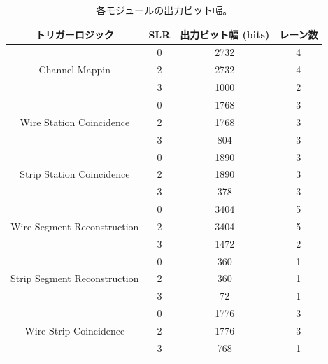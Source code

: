 \begin{table}[]
    \centering
    \caption[各モジュールの出力ビット幅]{各モジュールの出力ビット幅。}
    \label{tab:output_width}    
    \begin{tabular}{|c|c|c|c|}
    \hline
    トリガーロジック                                      & SLR & 出力ビット幅 (bits) & レーン数 \\ \hline\hline
    \multirow{3}{*}{Channel Mappin}               & 0   & 2732          & 4    \\ \cline{2-4} 
                                                  & 2   & 2732          & 4    \\ \cline{2-4} 
                                                  & 3   & 1000          & 2    \\ \hline
    \multirow{3}{*}{Wire Station Coincidence}     & 0   & 1768          & 3    \\ \cline{2-4} 
                                                  & 2   & 1768          & 3    \\ \cline{2-4} 
                                                  & 3   & 804           & 3    \\ \hline
    \multirow{3}{*}{Strip Station Coincidence}    & 0   & 1890          & 3    \\ \cline{2-4} 
                                                  & 2   & 1890          & 3    \\ \cline{2-4} 
                                                  & 3   & 378           & 3    \\ \hline
    \multirow{3}{*}{Wire Segment Reconstruction}  & 0   & 3404          & 5    \\ \cline{2-4} 
                                                  & 2   & 3404          & 5    \\ \cline{2-4} 
                                                  & 3   & 1472          & 2    \\ \hline
    \multirow{3}{*}{Strip Segment Reconstruction} & 0   & 360           & 1    \\ \cline{2-4} 
                                                  & 2   & 360           & 1    \\ \cline{2-4} 
                                                  & 3   & 72            & 1    \\ \hline
    \multirow{3}{*}{Wire Strip Coincidence}       & 0   & 1776          & 3    \\ \cline{2-4} 
                                                  & 2   & 1776          & 3    \\ \cline{2-4} 
                                                  & 3   & 768           & 1    \\ \hline
    \end{tabular}
\end{table}

